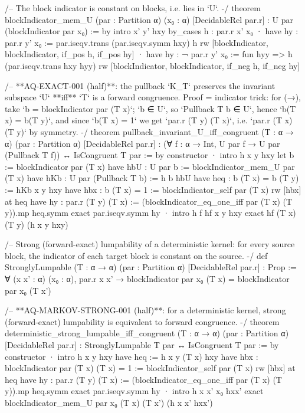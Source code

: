 /-- The block indicator is constant on blocks, i.e. lies in `U`. -/
theorem blockIndicator_mem_U (par : Partition α) (x₀ : α) [DecidableRel par.r] :
    U par (blockIndicator par x₀) := by
  intro x' y' hxy
  by_cases h : par.r x' x₀
  · have hy : par.r y' x₀ := par.iseqv.trans (par.iseqv.symm hxy) h
    rw [blockIndicator, blockIndicator, if_pos h, if_pos hy]
  · have hy : ¬ par.r y' x₀ := fun hyy => h (par.iseqv.trans hxy hyy)
    rw [blockIndicator, blockIndicator, if_neg h, if_neg hy]

/-- **AQ-EXACT-001 (half)**: the pullback `K_T` preserves the invariant subspace
    `U` **iff** `T` is a forward congruence. Proof = indicator trick: for (→),
    take `b = blockIndicator par (T x)`; `b ∈ U`, so `Pullback T b ∈ U`, hence
    `b(T x) = b(T y)`, and since `b(T x) = 1` we get `par.r (T y) (T x)`, i.e.
    `par.r (T x) (T y)` by symmetry. -/
theorem pullback_invariant_U_iff_congruent (T : α → α) (par : Partition α)
    [DecidableRel par.r] :
    (∀ f : α → Int, U par f → U par (Pullback T f)) ↔ IsCongruent T par := by
  constructor
  · intro h x y hxy
    let b := blockIndicator par (T x)
    have hbU : U par b := blockIndicator_mem_U par (T x)
    have hKb : U par (Pullback T b) := h b hbU
    have heq : b (T x) = b (T y) := hKb x y hxy
    have hbx : b (T x) = 1 := blockIndicator_self par (T x)
    rw [hbx] at heq
    have hy : par.r (T y) (T x) :=
      (blockIndicator_eq_one_iff par (T x) (T y)).mp heq.symm
    exact par.iseqv.symm hy
  · intro h f hf x y hxy
    exact hf (T x) (T y) (h x y hxy)

/-- Strong (forward-exact) lumpability of a deterministic kernel: for every
    source block, the indicator of each target block is constant on the source. -/
def StronglyLumpable (T : α → α) (par : Partition α) [DecidableRel par.r] : Prop :=
  ∀ (x x' : α) (x₀ : α), par.r x x' →
    blockIndicator par x₀ (T x) = blockIndicator par x₀ (T x')

/-- **AQ-MARKOV-STRONG-001 (half)**: for a deterministic kernel, strong
    (forward-exact) lumpability is equivalent to forward congruence. -/
theorem deterministic_strong_lumpable_iff_congruent (T : α → α) (par : Partition α)
    [DecidableRel par.r] : StronglyLumpable T par ↔ IsCongruent T par := by
  constructor
  · intro h x y hxy
    have heq := h x y (T x) hxy
    have hbx : blockIndicator par (T x) (T x) = 1 := blockIndicator_self par (T x)
    rw [hbx] at heq
    have hy : par.r (T y) (T x) :=
      (blockIndicator_eq_one_iff par (T x) (T y)).mp heq.symm
    exact par.iseqv.symm hy
  · intro h x x' x₀ hxx'
    exact blockIndicator_mem_U par x₀ (T x) (T x') (h x x' hxx')

